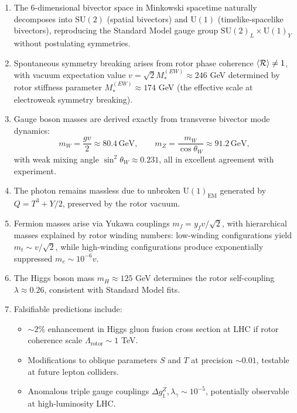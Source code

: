 \documentclass[11pt,a4paper]{article}
\newcommand{\Rotor}{\mathcal{R}}
\newcommand{\SU}{\mathrm{SU}}
\newcommand{\U}{\mathrm{U}}
\theoremstyle{definition}
\theoremstyle{plain}
\theoremstyle{remark}
\begin{document}
\begin{enumerate}[leftmargin=*,itemsep=3pt]
  \item The 6-dimensional bivector space in Minkowski spacetime naturally decomposes into $\SU(2)$ (spatial bivectors) and $\U(1)$ (timelike-spacelike bivectors), reproducing the Standard Model gauge group $\SU(2)_L \times \U(1)_Y$ without postulating symmetries.

  \item Spontaneous symmetry breaking arises from rotor phase coherence $\ev{\Rotor} \neq 1$, with vacuum expectation value $v = \sqrt{2}M_*^{(EW)} \approx 246$ GeV determined by rotor stiffness parameter $M_*^{(EW)} \approx 174$ GeV (the effective scale at electroweak symmetry breaking).

  \item Gauge boson masses are derived exactly from transverse bivector mode dynamics:
  \begin{equation*}
  m_W = \frac{gv}{2} \approx 80.4\,\text{GeV}, \qquad
  m_Z = \frac{m_W}{\cos\theta_W} \approx 91.2\,\text{GeV},
  \end{equation*}
  with weak mixing angle $\sin^2\theta_W \approx 0.231$, all in excellent agreement with experiment.

  \item The photon remains massless due to unbroken $\U(1)_{\text{EM}}$ generated by $Q = T^3 + Y/2$, preserved by the rotor vacuum.

  \item Fermion masses arise via Yukawa couplings $m_f = y_f v/\sqrt{2}$, with hierarchical masses explained by rotor winding numbers: low-winding configurations yield $m_t \sim v/\sqrt{2}$, while high-winding configurations produce exponentially suppressed $m_e \sim 10^{-6}v$.

  \item The Higgs boson mass $m_H \approx 125$ GeV determines the rotor self-coupling $\lambda \approx 0.26$, consistent with Standard Model fits.

  \item Falsifiable predictions include:
  \begin{itemize}
    \item $\sim 2\%$ enhancement in Higgs gluon fusion cross section at LHC if rotor coherence scale $\Lambda_{\text{rotor}} \sim 1$ TeV.
    \item Modifications to oblique parameters $S$ and $T$ at precision $\sim 0.01$, testable at future lepton colliders.
    \item Anomalous triple gauge couplings $\Delta g_1^Z, \lambda_\gamma \sim 10^{-5}$, potentially observable at high-luminosity LHC.
  \end{itemize}
\end{enumerate}
\end{document}
